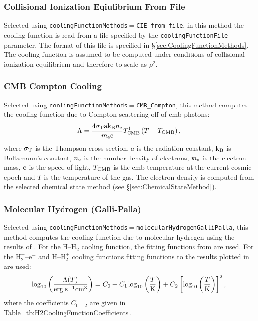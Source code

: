 \subsubsection{Collisional Ionization Eqiulibrium From File}

Selected using {\tt coolingFunctionMethods}$=${\tt CIE\_from\_file}, in this method the cooling function is read from a file specified by the {\tt coolingFunctionFile} parameter. The format of this file is specified in \S\ref{sec:CoolingFunctionMethods}. The cooling function is assumed to be computed under conditions of collisional ionization equilibrium and therefore to scale as $\rho^2$.

\subsubsection{CMB Compton Cooling}

Selected using {\tt coolingFunctionMethods}$=${\tt CMB\_Compton}, this method computes the cooling function due to Compton scattering off of \gls{cmb} photons:
\begin{equation}
\Lambda = {4 \sigma_{\rm T} {\rm a} {\rm k}_{\rm B} n_{\rm e } \over m_{\rm e} \clight} T_{\rm CMB}^4 \left( T - T_{\rm CMB} \right),
\end{equation}
where $\sigma_{\rm T}$ is the Thompson cross-section, $a$ is the radiation constant, ${\rm k}_{\rm B}$ is Boltzmann's constant, $n_{\rm e}$ is the number density of electrons, $m_{\rm e}$ is the electron mass, $\clight$ is the speed of light, $T_{\rm CMB}$ is the \gls{cmb} temperature at the current cosmic epoch and $T$ is the temperature of the gas. The electron density is computed from the selected chemical state method (see \S\ref{sec:ChemicalStateMethod}).

\subsubsection{Molecular Hydrogen (Galli-Palla)}

Selected using {\tt coolingFunctionMethods}$=${\tt molecularHydrogenGalliPalla}, this method computes the cooling function due to molecular hydrogen using the results of \cite{galli_chemistry_1998}. For the H--H$_2$ cooling function, the fitting functions from \cite{galli_chemistry_1998} are used. For the H$_2^+$--e$^-$ and H--H$_2^+$ cooling functions fitting functions to the results plotted in  \cite{suchkov_cooling_1978} are used:
\begin{equation}
\log_{10}\left({\Lambda(T) \over \hbox{erg s}^{-1} \hbox{cm}^3}\right) = C_0 + C_1 \log_{10} \left({T\over\hbox{K}}\right) + C_2 \left[\log_{10} \left({T\over\hbox{K}}\right)\right]^2,
\label{eq:H2CoolingFunction}
\end{equation}
where the coefficients $C_{0-2}$ are given in Table~\ref{tb:H2CoolingFunctionCoefficients}.

